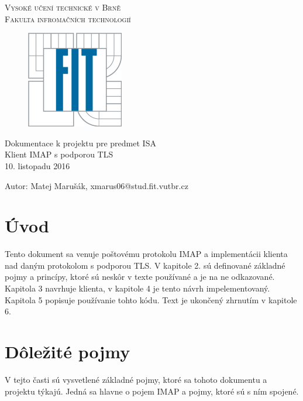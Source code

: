 \documentclass{article}
\begin{document}
\begin{titlepage}
\begin{center}
\Huge\textsc{Vysoké učení technické v Brně}\\
\LARGE\textsc{Fakulta infromačních technologií}\\


\vspace{2cm}
\begin{figure}[H]
\centering
\includegraphics[scale=1.3]{FIT_ikonova_varianta_loga_barva.png}
\end{figure}
\vspace{1cm}


\LARGE{Dokumentace k projektu pre predmet ISA}\\
\huge{Klient IMAP s podporou TLS}\\
\Large
\vspace{1.5cm}
10. listopadu 2016\\
\vspace{3.1cm}
\end{center}

\Large
Autor: Matej Marušák, xmarus06@stud.fit.vutbr.cz
\end{titlepage}

\tableofcontents
\pagebreak

\section{Úvod}
Tento dokument sa venuje poštovému protokolu IMAP a implementácii klienta nad daným protokolom s podporou TLS. V kapitole 2. sú definované základné pojmy a princípy, ktoré sú neskôr v texte používané a je na ne odkazované. Kapitola 3 navrhuje klienta, v kapitole 4 je tento návrh impelementovaný. Kapitola 5 popisuje používanie tohto kódu. Text je ukončený zhrnutím v kapitole 6.
\section{Dôležité pojmy}
V tejto časti sú vysvetlené základné pojmy, ktoré sa tohoto dokumentu a projektu týkajú. Jedná sa hlavne o pojem IMAP a pojmy, ktoré sú s ním spojené. 
\end{document}
